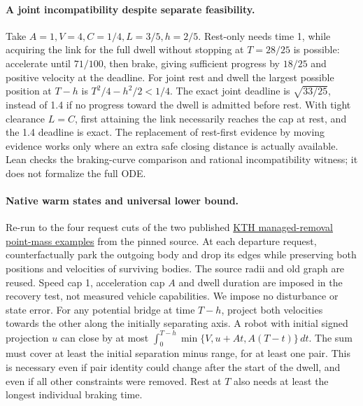 \documentclass[11pt]{article}
\begin{document}
\paragraph{A joint incompatibility despite separate feasibility.}
Take \(A=1,V=4,C=1/4,L=3/5,h=2/5\). Rest-only needs time 1,
while acquiring the link for the full dwell without stopping at
\(T=28/25\) is possible: accelerate until \(71/100\), then brake,
giving sufficient progress by \(18/25\) and positive velocity at
the deadline. For joint rest and dwell the largest possible
position at \(T-h\) is \(T^2/4-h^2/2<1/4\). The exact joint
deadline is \(\sqrt{33/25}\), instead of 1.4 if no progress
toward the dwell is admitted before rest. With tight clearance
\(L=C\), first attaining the link necessarily reaches the cap
at rest, and the 1.4 deadline is exact. The replacement of
rest-first evidence by moving evidence works only where an
extra safe closing distance is actually available.
Lean checks the braking-curve comparison and rational
incompatibility witness; it does not formalize the full ODE.

\paragraph{Native warm states and universal lower bound.}
Re-run to the four request cuts of the two published
\href{https://arxiv.org/html/2609.29939v1}{KTH managed-removal point-mass examples}
from the pinned source. At each departure request, counterfactually
park the outgoing body and drop its edges while preserving both
positions and velocities of surviving bodies. The source radii
and old graph are reused. Speed cap 1, acceleration cap \(A\)
and dwell duration are imposed in the recovery test, not measured
vehicle capabilities. We impose no disturbance or state error.
For any potential bridge at time \(T-h\), project both velocities
towards the other along the initially separating axis.
A robot with initial signed projection \(u\) can close by
at most \(\int_0^{T-h}\min\{V,u+At,A(T-t)\}\,dt\).
The sum must cover at least the initial separation minus range,
for at least one pair. This is necessary even if pair identity
could change after the start of the dwell, and even if all other
constraints were removed. Rest at \(T\) also needs at least the
longest individual braking time.
\end{document}

